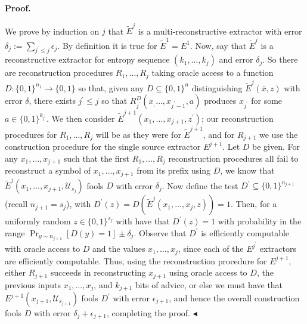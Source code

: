 



\par\medskip\noindent\textbf{Proof.}\par




We prove by induction on $j$ that $\tilde{E}^{j}$ is a multi-reconstructive extractor with error $\delta_{j}:=\sum_{j^{\prime}\leq j}\epsilon_{j}$. By definition it is true for $\tilde{E}^{1}=E^{1}$.
Now, say that $\tilde{E}^{j}$ is a reconstructive extractor for entropy sequence $(k_{1},\ldots,k_{j})$ and error $\delta_{j}$. So there are reconstruction procedures $R_{1},\ldots,R_{j}$ taking oracle access to a function $D:\{0,1\}^{n_{1}}\to\{0,1\}$ so that, given any $D\subseteq\{0,1\}^{n}$ distinguishing $\tilde{E}^{j}(\bar{x},z)$ with error $\delta$, there exists $j^{\prime}\leq j$ so that $R_{j^{\prime}}^{D}(x_{,}\ldots,x_{j^{\prime}-1},a)$ produces $x_{j^{\prime}}$ for some $a\in\{0,1\}^{k_{j^{\prime}}}$. We then consider $\tilde{E}^{j+1}(x_{1},\ldots,x_{j+1},z^{\prime})$; our reconstruction procedures for $R_{1},\ldots,R_{j}$ will be as they were for $\tilde{E}^{j+1}$, and for $R_{j+1}$ we use the construction procedure for the single source extractor $E^{j+1}$.
Let $D$ be given. For any $x_{1},\ldots,x_{j+1}$ such that the first $R_{1},\ldots,R_{j}$ reconstruction procedures all fail to reconstruct a symbol of $x_{1},\ldots,x_{j+1}$ from its prefix using $D$, we know that $\tilde{E}^{j}(x_{1},\ldots,x_{j+1},\mathcal{U}_{s_{j}})$ fools $D$ with error $\delta_{j}$. Now define the test $D^{\prime}\subseteq\{0,1\}^{n_{j+1}}$ (recall $n_{j+1}=s_{j}$), with $D^{\prime}(z)=D(\tilde{E}^{j}(x_{1},\ldots,x_{j},z))=1$. Then, for a uniformly random $z\in\{0,1\}^{s_{j}}$ with have that $D^{\prime}(z)=1$ with probability in the range $\Pr_{y\sim n_{j+1}}[D(y)=1]\pm\delta_{j}$. Observe that $D^{\prime}$ is efficiently computable with oracle access to $D$ and the values $x_{1},\ldots,x_{j}$, since each of the $E^{j^{\prime}}$ extractors are efficiently computable. Thus, using the reconstruction procedure for $E^{j+1}$, either $R_{j+1}$ succeeds in reconstructing $x_{j+1}$ using oracle access to $D$, the previous inputs $x_{1},\ldots,x_{j}$, and $k_{j+1}$ bits of advice, or else we must have that $E^{j+1}(x_{j+1},\mathcal{U}_{s_{j+1}})$ fools $D^{\prime}$ with error $\epsilon_{j+1}$, and hence the overall construction fools $D$ with error $\delta_{j}+\epsilon_{j+1}$, completing the proof.
$\blacktriangleleft$\par




